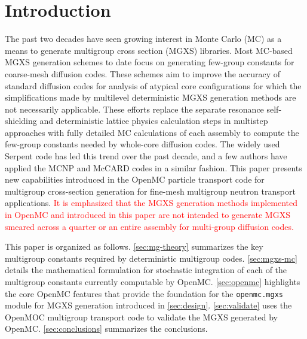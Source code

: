 \section{Introduction}
\label{sec:intro}

The past two decades have seen growing interest in Monte Carlo (MC) as a means to generate multigroup cross section (MGXS) libraries. Most MC-based MGXS generation schemes to date focus on generating few-group constants for coarse-mesh diffusion codes. These schemes aim to improve the accuracy of standard diffusion codes for analysis of atypical core configurations for which the simplifications made by multilevel deterministic MGXS generation methods are not necessarily applicable. These efforts replace the separate resonance self-shielding and deterministic lattice physics calculation steps in multistep approaches with fully detailed MC calculations of each assembly to compute the few-group constants needed by whole-core diffusion codes. The widely used Serpent code\cite{leppanen2015serpent} has led this trend over the past decade, and a few authors have applied the MCNP\cite{pounders2006stochastically} and McCARD\cite{shim2008generation} codes in a similar fashion. This paper presents new capabilities introduced in the OpenMC\cite{romano2015openmc} particle transport code for multigroup cross-section generation for fine-mesh multigroup neutron transport applications. \textcolor{red}{It is emphasized that the MGXS generation methods implemented in OpenMC and introduced in this paper are not intended to generate MGXS smeared across a quarter or an entire assembly for multi-group diffusion codes.}

This paper is organized as follows. \cref{sec:mg-theory} summarizes the key multigroup constants required by deterministic multigroup codes. \cref{sec:mgxs-mc} details the mathematical formulation for stochastic integration of each of the multigroup constants currently computable by OpenMC. \cref{sec:openmc} highlights the core OpenMC features that provide the foundation for the \texttt{openmc.mgxs} module for MGXS generation introduced in \cref{sec:design}. \cref{sec:validate} uses the OpenMOC\cite{boyd2014openmoc} multigroup transport code to validate the MGXS generated by OpenMC. \cref{sec:conclusions} summarizes the conclusions.
